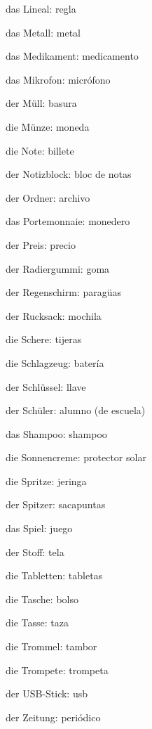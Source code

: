 \begin{multicols}{3}
\begin{myitemize}
\item das Lineal: regla
\item das Metall: metal
\item das Medikament: medicamento
\item das Mikrofon: micrófono
\item der Müll: basura
\item die Münze: moneda
\item die Note: billete
\item der Notizblock: bloc de notas
\item der Ordner: archivo
\item das Portemonnaie: monedero
\item der Preis: precio
\item der Radiergummi: goma
\item der Regenschirm: paragüas
\item der Rucksack: mochila
\item die Schere: tijeras
\item die Schlagzeug: batería
\item der Schlüssel: llave
\item der Schüler: alumno (de escuela)
\item das Shampoo: shampoo
\item die Sonnencreme: protector solar
\item die Spritze: jeringa
\item der Spitzer: sacapuntas
\item das Spiel: juego
\item der Stoff: tela
\item die Tabletten: tabletas
\item die Tasche: bolso
\item die Tasse: taza
\item die Trommel: tambor
\item die Trompete: trompeta
\item der USB-Stick: usb
\item der Zeitung: periódico
\end{myitemize}
\end{multicols}

